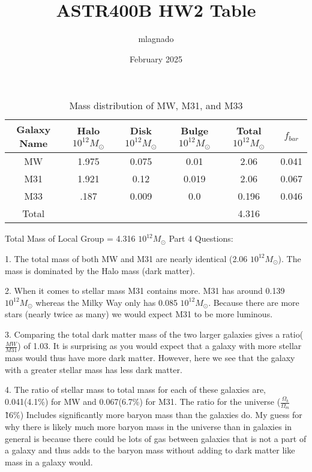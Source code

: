 \documentclass{article}
\title{ASTR400B HW2 Table}
\author{mlagnado }
\date{February 2025}
\begin{document}
\maketitle



    \begin{table}[h]
    \begin{tabular}{|c|c|c|c|c|c|} \hline  
         Galaxy Name&  Halo $10^{12} M_{\odot}$&   Disk $10^{12} M_{\odot}$&  Bulge $10^{12} M_{\odot}$&  Total $10^{12} M_{\odot}$& $f_{bar}$\\ \hline  
         MW&  1.975&  0.075&  0.01&  2.06& 0.041\\ \hline  
         M31&  1.921&  0.12&  0.019&  2.06& 0.067\\ \hline  
         M33&  .187&  0.009&  0.0&  0.196& 0.046\\ \hline  
         Total& & & &4.316& \\ \hline 
    \end{tabular}
    \caption{Mass distribution of MW, M31, and M33}
    \label{tab:my_label}
\end{table}

Total Mass of Local Group = 4.316 $10^{12} M_{\odot}$ \newline
\newline Part 4 Questions:

1. The total mass of both MW and M31 are nearly identical (2.06 $10^{12} M_{\odot}$). The mass is dominated by the Halo mass (dark matter).


2. When it comes to stellar mass M31 contains more. M31 has around 0.139 $10^{12} M_{\odot}$ whereas the Milky Way only has 0.085 $10^{12} M_{\odot}$. Because there are more stars (nearly twice as many) we would expect M31 to be more luminous.


3. Comparing the total dark matter mass of the two larger galaxies gives a ratio($\frac{MW}{M31}$) of 1.03. It is surprising as you would expect that a galaxy with more stellar mass would thus have more dark matter. However, here we see that the galaxy with a greater stellar mass has less dark matter.


4. The ratio of stellar mass to total mass for each of these galaxies are, 0.041(4.1\%) for MW and 0.067(6.7\%) for M31. The ratio for the universe ($\frac{\Omega_b}{\Omega_m}$ \~ 16\%) Includes significantly more baryon mass than the galaxies do. My guess for why there is likely much more baryon mass in the universe than in galaxies in general is because there could be lots of gas between galaxies that is not a part of a galaxy and thus adds to the baryon mass without adding to dark matter like mass in a galaxy would.
\end{document}
